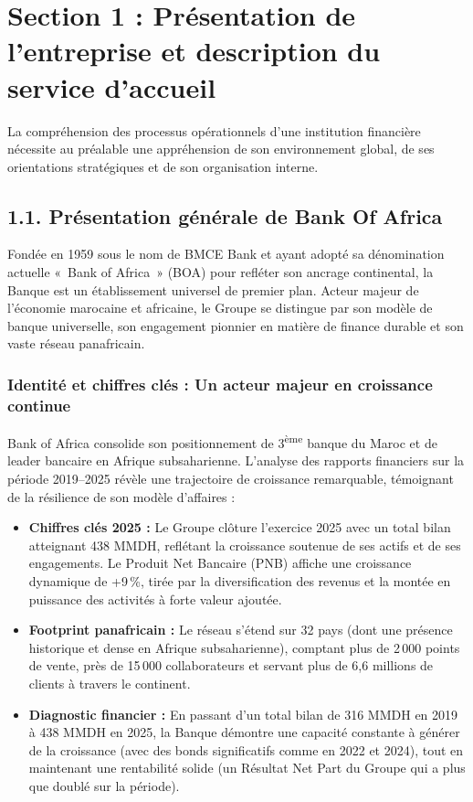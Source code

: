 \documentclass[12pt,a4paper]{report}
\begin{document}
\section*{Section 1 : Présentation de l'entreprise et description du service d'accueil}

La compréhension des processus opérationnels d'une institution financière nécessite au préalable une appréhension de son environnement global, de ses orientations stratégiques et de son organisation interne.

\subsection*{1.1. Présentation générale de Bank Of Africa}

Fondée en 1959 sous le nom de BMCE Bank et ayant adopté sa dénomination actuelle «~Bank of Africa~» (BOA) pour refléter son ancrage continental, la Banque est un établissement universel de premier plan. Acteur majeur de l'économie marocaine et africaine, le Groupe se distingue par son modèle de banque universelle, son engagement pionnier en matière de finance durable et son vaste réseau panafricain.

\subsubsection*{Identité et chiffres clés : Un acteur majeur en croissance continue}

Bank of Africa consolide son positionnement de 3\textsuperscript{ème} banque du Maroc et de leader bancaire en Afrique subsaharienne. L'analyse des rapports financiers sur la période 2019--2025 révèle une trajectoire de croissance remarquable, témoignant de la résilience de son modèle d'affaires :

\begin{itemize}
  \item \textbf{Chiffres clés 2025 :} Le Groupe clôture l'exercice 2025 avec un total bilan atteignant 438 MMDH, reflétant la croissance soutenue de ses actifs et de ses engagements. Le Produit Net Bancaire (PNB) affiche une croissance dynamique de +9\,\%, tirée par la diversification des revenus et la montée en puissance des activités à forte valeur ajoutée.

  \item \textbf{Footprint panafricain :} Le réseau s'étend sur 32 pays (dont une présence historique et dense en Afrique subsaharienne), comptant plus de 2\,000 points de vente, près de 15\,000 collaborateurs et servant plus de 6,6 millions de clients à travers le continent.

  \item \textbf{Diagnostic financier :} En passant d'un total bilan de 316 MMDH en 2019 à 438 MMDH en 2025, la Banque démontre une capacité constante à générer de la croissance (avec des bonds significatifs comme en 2022 et 2024), tout en maintenant une rentabilité solide (un Résultat Net Part du Groupe qui a plus que doublé sur la période).
\end{itemize}
\end{document}
